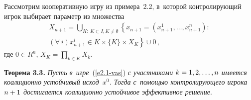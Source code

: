 \begin{multicols}{2}
    Рассмотрим кооперативную игру из примера~2.2, в~которой контролирующий
игрок выбирает параметр из множества
   \begin{multline*}
    X_{n+1} =\mathop{\bigcup}\limits_{K:\ K\subset I, K\not= \emptyset} \left\{
    x_{n+1}=\left( x^1_{n+1},\ldots, x^n_{n+1}\right):\right.\\
    \left. (\forall\ i) x^i_{n+1} \in
K\times \{K\}\times X_K\right\}\cup 0\,,
    \end{multline*}
где $0\in R^n$, $X_K=\prod\limits_{k\in K} X_k$.

    \smallskip

    \noindent
    \textbf{Теорема 3.3.} \textit{Пусть в~игре}~(\ref{e2.1-vas}) \textit{с
участниками $k\hm= 1,2, \ldots, n$ имеется коалиционно устойчивый исход~$x^0$.
Тогда с~помощью контролирующего игрока $n\hm+1$ достигается коалиционно
устойчивое эффективное решение}.


\end{multicols}
